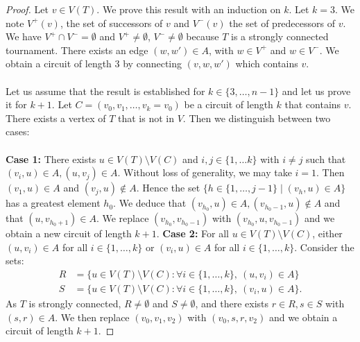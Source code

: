 \documentclass[12pt,a4paper]{article}
\theoremstyle{definition}
\begin{document}
\begin{proof}
Let $v \in V(T)$. We prove this result with an induction on $k$. Let $k=3$. We note $V^+(v)$, the set of successors of $v$ and $V^-(v)$ the set of predecessors of $v$. We have $V^+ \cap V^- = \emptyset$ and $V^+ \neq \emptyset$, $V^- \neq \emptyset$ because $T$ is a strongly connected tournament. There exists an edge $(w,w') \in A$, with $w \in V^+$ and $w \in V^-$. We obtain a circuit of length $3$ by connecting $(v,w,w')$ which contains $v$. \\\\
Let us assume that the result is established for $k \in \{ 3, \dots , n-1\}$ and let us prove it for $k+1$. Let $C= (v_0,v_1, \dots ,  v_k=v_0)$ be a circuit of length $k$ that contains $v$. There exists a vertex of $T$ that is not in $V$. Then we distinguish between two cases: \\\\
\textbf{Case 1:} There exists $u \in V(T) \setminus V(C)$ and $i,j \in \{1, \dots k\}$ with $i \neq j$ such that $(v_i,u) \in A, (u,v_j) \in A$. Without loss of generality, we may take $i=1$. Then $(v_1,u) \in A$ and $(v_j,u) \notin A$. Hence the set $\{h \in \{1,  \dots , j-1\} \mid (v_h,u) \in A \}$ has a greatest element $h_0$. We deduce that $(v_{h_0},u) \in A, (v_{h_0-1},u) \notin A$ and that $(u,v_{h_0 +1}) \in A$. We replace $(v_{h_0},v_{h_0-1})$ with  $(v_{h_0}, u,v_{h_0-1})$ and we obtain a new circuit of length $k+1$. 
\newpage
\noindent \textbf{Case 2:} For all $u \in V(T) \setminus V(C)$, either $(u,v_i) \in A$ for all $i \in \{1, \dots ,  k\}$ or $(v_i,u) \in A$ for all $i \in \{1, \dots , k\}$. Consider the sets:
\begin{align*}
R&= \{ u \in V(T) \setminus V(C) : \forall i \in \{1, \dots , k \}, \ (u,v_i) \in A \} \\
S&= \{ u \in V(T) \setminus V(C) : \forall i \in \{1, \dots ,  k \}, \ (v_i,u) \in A\}.
\end{align*}
As $T$ is strongly connected, $R \neq \emptyset$ and $S \neq \emptyset$, and there exists $r \in R, s \in S$ with $(s,r) \in A$. We then replace $(v_0,v_1,v_2)$ with $(v_0,s,r,v_2)$ and we obtain a circuit of length $k+1$.
\end{proof}
\newpage
\end{document}
